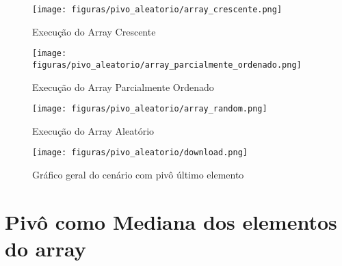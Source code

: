 \begin{figure}[H]
    \centering
    \caption{Execução do Array Crescente}
    \texttt{[image: figuras/pivo\_aleatorio/array\_crescente.png]}
    \label{fig:pivo_ultimo_crescente}
\end{figure}

\begin{figure}[H]
    \centering
    \caption{Execução do Array Parcialmente Ordenado}
    \texttt{[image: figuras/pivo\_aleatorio/array\_parcialmente\_ordenado.png]}
    \label{fig:pivo_ultimo_parcialmente}
\end{figure}

\begin{figure}[H]
    \centering
    \caption{Execução do Array Aleatório}
    \texttt{[image: figuras/pivo\_aleatorio/array\_random.png]}
    \label{fig:pivo_ultimo_random}
\end{figure}

\begin{figure}[H]
    \centering
    \caption{Gráfico geral do cenário com pivô último elemento}
    \texttt{[image: figuras/pivo\_aleatorio/download.png]}
    \label{fig:pivo_ultimo_grafico}
\end{figure}

\section{\esp Pivô como Mediana dos elementos do array}

\begin{table}[H]
    \centering
    \scriptsize
    \caption{Comparação dos cenários com pivô sendo a mediana, considerando $n=1000$.}
    \label{tab:pivo_ultimo}
    
\end{table}

